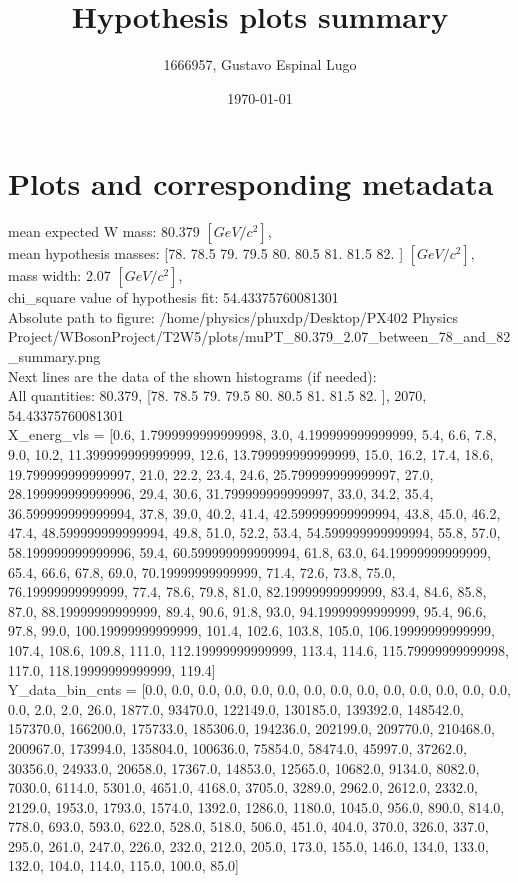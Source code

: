 \documentclass[12pt]{article}
\begin{document}
	\title{Hypothesis plots summary} %
	\author{1666957, Gustavo Espinal Lugo}
	\date{\today} %

	\maketitle
	
	\section*{Plots and corresponding metadata}
	mean expected W mass: 80.379 $[GeV/c^{2}]$,\\
mean hypothesis masses: [78.  78.5 79.  79.5 80.  80.5 81.  81.5 82. ] $[GeV/c^{2}]$,\\
mass width: 2.07 $[GeV/c^{2}]$,\\
chi\_square value of hypothesis fit: 54.43375760081301\\
	Absolute path to figure: /home/physics/phuxdp/Desktop/PX402 Physics Project/WBosonProject/T2W5/plots/muPT\_80.379\_2.07\_between\_78\_and\_82\_summary.png\\
	Next lines are the data of the shown histograms (if needed): \\
	All quantities: 	80.379, [78.  78.5 79.  79.5 80.  80.5 81.  81.5 82. ], 2070, 54.43375760081301\\
	X\_energ\_vls = [0.6, 1.7999999999999998, 3.0, 4.199999999999999, 5.4, 6.6, 7.8, 9.0, 10.2, 11.399999999999999, 12.6, 13.799999999999999, 15.0, 16.2, 17.4, 18.6, 19.799999999999997, 21.0, 22.2, 23.4, 24.6, 25.799999999999997, 27.0, 28.199999999999996, 29.4, 30.6, 31.799999999999997, 33.0, 34.2, 35.4, 36.599999999999994, 37.8, 39.0, 40.2, 41.4, 42.599999999999994, 43.8, 45.0, 46.2, 47.4, 48.599999999999994, 49.8, 51.0, 52.2, 53.4, 54.599999999999994, 55.8, 57.0, 58.199999999999996, 59.4, 60.599999999999994, 61.8, 63.0, 64.19999999999999, 65.4, 66.6, 67.8, 69.0, 70.19999999999999, 71.4, 72.6, 73.8, 75.0, 76.19999999999999, 77.4, 78.6, 79.8, 81.0, 82.19999999999999, 83.4, 84.6, 85.8, 87.0, 88.19999999999999, 89.4, 90.6, 91.8, 93.0, 94.19999999999999, 95.4, 96.6, 97.8, 99.0, 100.19999999999999, 101.4, 102.6, 103.8, 105.0, 106.19999999999999, 107.4, 108.6, 109.8, 111.0, 112.19999999999999, 113.4, 114.6, 115.79999999999998, 117.0, 118.19999999999999, 119.4]\\
	Y\_data\_bin\_cnts = [0.0, 0.0, 0.0, 0.0, 0.0, 0.0, 0.0, 0.0, 0.0, 0.0, 0.0, 0.0, 0.0, 0.0, 0.0, 2.0, 2.0, 26.0, 1877.0, 93470.0, 122149.0, 130185.0, 139392.0, 148542.0, 157370.0, 166200.0, 175733.0, 185306.0, 194236.0, 202199.0, 209770.0, 210468.0, 200967.0, 173994.0, 135804.0, 100636.0, 75854.0, 58474.0, 45997.0, 37262.0, 30356.0, 24933.0, 20658.0, 17367.0, 14853.0, 12565.0, 10682.0, 9134.0, 8082.0, 7030.0, 6114.0, 5301.0, 4651.0, 4168.0, 3705.0, 3289.0, 2962.0, 2612.0, 2332.0, 2129.0, 1953.0, 1793.0, 1574.0, 1392.0, 1286.0, 1180.0, 1045.0, 956.0, 890.0, 814.0, 778.0, 693.0, 593.0, 622.0, 528.0, 518.0, 506.0, 451.0, 404.0, 370.0, 326.0, 337.0, 295.0, 261.0, 247.0, 226.0, 232.0, 212.0, 205.0, 173.0, 155.0, 146.0, 134.0, 133.0, 132.0, 104.0, 114.0, 115.0, 100.0, 85.0]\\
\end{document}
